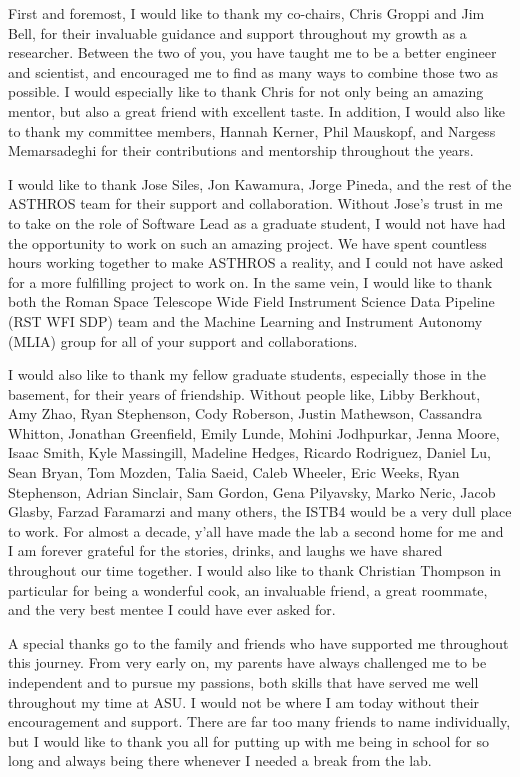 First and foremost, I would like to thank my co-chairs, Chris Groppi and Jim Bell, for their invaluable guidance and support throughout my growth as a researcher.
Between the two of you, you have taught me to be a better engineer and scientist, and encouraged me to find as many ways to combine those two as possible.
I would especially like to thank Chris for not only being an amazing mentor, but also a great friend with excellent taste. 
In addition, I would also like to thank my committee members, Hannah Kerner, Phil Mauskopf, and Nargess Memarsadeghi for their contributions and mentorship throughout the years. 

I would like to thank Jose Siles, Jon Kawamura, Jorge Pineda, and the rest of the ASTHROS team for their support and collaboration.
Without Jose's trust in me to take on the role of Software Lead as a graduate student, I would not have had the opportunity to work on such an amazing project.
We have spent countless hours working together to make ASTHROS a reality, and I could not have asked for a more fulfilling project to work on.
In the same vein, I would like to thank both the Roman Space Telescope Wide Field Instrument Science Data Pipeline (RST WFI SDP) team and the Machine Learning and Instrument Autonomy (MLIA) group for all of your support and collaborations.

I would also like to thank my fellow graduate students, especially those in the basement, for their years of friendship.
Without people like, Libby Berkhout, Amy Zhao, Ryan Stephenson, Cody Roberson, Justin Mathewson, Cassandra Whitton, Jonathan Greenfield, Emily Lunde, Mohini Jodhpurkar, Jenna Moore, Isaac Smith, Kyle Massingill, Madeline Hedges, Ricardo Rodriguez, Daniel Lu, Sean Bryan, Tom Mozden, Talia Saeid, Caleb Wheeler, Eric Weeks, Ryan Stephenson, Adrian Sinclair, Sam Gordon, Gena Pilyavsky, Marko Neric, Jacob Glasby, Farzad Faramarzi and many others, the ISTB4 would be a very dull place to work. 
For almost a decade, y'all have made the lab a second home for me and I am forever grateful for the stories, drinks, and laughs we have shared throughout our time together.
I would also like to thank Christian Thompson in particular for being a wonderful cook, an invaluable friend, a great roommate, and the very best mentee I could have ever asked for.

A special thanks go to the family and friends who have supported me throughout this journey. 
From very early on, my parents have always challenged me to be independent and to pursue my passions, both skills that have served me well throughout my time at ASU.
I would not be where I am today without their encouragement and support.
There are far too many friends to name individually, but I would like to thank you all for putting up with me being in school for so long and always being there whenever I needed a break from the lab.

